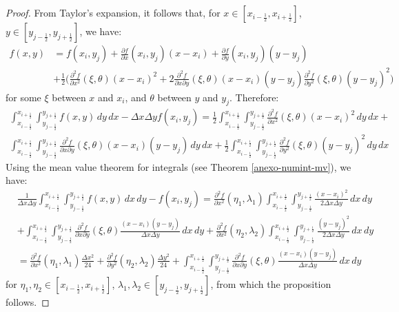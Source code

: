 \begin{proof}
	From Taylor's expansion, it follows that, for $x \in [x_{i-\frac{1}{2}},x_{i+\frac{1}{2}}]$, 
	$y \in [y_{j-\frac{1}{2}},y_{j+\frac{1}{2}}]$, we have:
	\begin{align*}
		f(x,y) &= f(x_i,y_j) +  \frac{\partial f}{\partial x}(x_i,y_j)(x-x_i) +\frac{\partial f}{\partial y}(x_i,y_j)(y-y_j) \\
		&+\frac{1}{2}\bigg(\frac{\partial^2 f}{\partial x^2}(\xi,\theta)(x-x_i)^2 +
		2\frac{\partial^2 f}{\partial x \partial y}(\xi,\theta)(x-x_i)(y-y_j)
		\frac{\partial^2 f}{\partial y^2}(\xi,\theta)(y-y_j)^2 \bigg)
	\end{align*}
	for some $\xi$ between $x$ and $x_i$, and $\theta$ between $y$ and $y_j$. Therefore:
	\begin{align*}
		\int_{x_{i-\frac{1}{2}}}^{x_{i+\frac{1}{2}}} 
		\int_{y_{j-\frac{1}{2}}}^{y_{j+\frac{1}{2}}} {f(x,y)\,dy \,dx} - \Delta x \Delta y f(x_i,y_j)  
		= 
		\frac{1}{2} 	
		\int_{x_{i-\frac{1}{2}}}^{x_{i+\frac{1}{2}}} 
		\int_{y_{j-\frac{1}{2}}}^{y_{j+\frac{1}{2}}} 
		{\frac{\partial^2 f}{\partial x^2}(\xi,\theta)(x-x_i)^2 \,dy \,dx} + \\
		\int_{x_{i-\frac{1}{2}}}^{x_{i+\frac{1}{2}}} 
		\int_{y_{j-\frac{1}{2}}}^{y_{j+\frac{1}{2}}} 
		{\frac{\partial^2 f}{\partial x \partial y}(\xi,\theta)(x-x_i)(y-y_j) \,dy \,dx}+
		\frac{1}{2} 	
		\int_{x_{i-\frac{1}{2}}}^{x_{i+\frac{1}{2}}} 
		\int_{y_{j-\frac{1}{2}}}^{y_{j+\frac{1}{2}}} 
		{\frac{\partial^2 f}{\partial y^2}(\xi,\theta)(y-y_j)^2 \,dy \,dx}
	\end{align*}
	Using the mean value theorem for integrals (see Theorem \ref{anexo-numint-mv}), we have:
	\begin{align*}
		&\frac{1}{\Delta x \Delta y}
		\int_{x_{i-\frac{1}{2}}}^{x_{i+\frac{1}{2}}} 
		\int_{y_{j-\frac{1}{2}}}^{y_{j+\frac{1}{2}}} 
		{f(x,y)\,dx \,dy} - f(x_i, y_j)  = 
		{\frac{\partial^2f}{\partial x^2}}(\eta_1, \lambda_1)
		\int_{x_{i-\frac{1}{2}}}^{x_{i+\frac{1}{2}}} 
		\int_{y_{j-\frac{1}{2}}}^{y_{j+\frac{1}{2}}}
		\frac{(x-x_i)^2}{2 \Delta x \Delta y}  \,dx \,dy \\  
		&+
		\int_{x_{i-\frac{1}{2}}}^{x_{i+\frac{1}{2}}} 
		\int_{y_{j-\frac{1}{2}}}^{y_{j+\frac{1}{2}}}
		{\frac{\partial^2 f}{\partial x \partial y}}(\xi,\theta)
		 \frac{(x-x_i)(y-y_j)}{\Delta x \Delta y}  \,dx \,dy +
		{\frac{\partial^2 f}{\partial x^2}}(\eta_2, \lambda_2)
		\int_{x_{i-\frac{1}{2}}}^{x_{i+\frac{1}{2}}} 
		\int_{y_{j-\frac{1}{2}}}^{y_{j+\frac{1}{2}}}
		\frac{(y-y_j)^2}{2 \Delta x \Delta y}  \,dx \,dy \\
		&= {\frac{\partial^2f}{\partial x^2}}(\eta_1, \lambda_1) \frac{\Delta x ^2}{24} +
	      {\frac{\partial^2f}{\partial y^2}}(\eta_2, \lambda_2) \frac{\Delta y ^2}{24} +
	   		\int_{x_{i-\frac{1}{2}}}^{x_{i+\frac{1}{2}}} 
	   \int_{y_{j-\frac{1}{2}}}^{y_{j+\frac{1}{2}}}
	   {\frac{\partial^2 f}{\partial x \partial y}}(\xi,\theta)
	   \frac{(x-x_i)(y-y_j)}{\Delta x \Delta y}  \,dx \,dy
	\end{align*}	
	for $\eta_1, \eta_2 \in [x_{i-\frac{1}{2}},x_{i+\frac{1}{2}}]$, 
	$\lambda_1, \lambda_2  \in [y_{j-\frac{1}{2}},y_{j+\frac{1}{2}}]$,
	from which the proposition follows.
\end{proof}